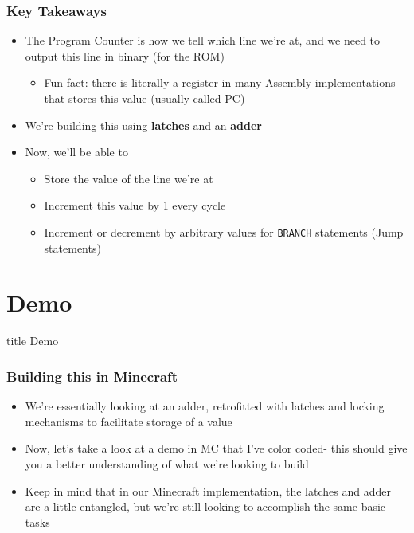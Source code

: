 \documentclass{beamer}
\begin{document}
             
        \begin{frame}
        	\frametitle{Key Takeaways}
        	\begin{itemize}
        		\item The Program Counter is how we tell which line we're at, and we need to output this line in binary (for the ROM)
        		\begin{itemize}
        			\item Fun fact: there is literally a register in many Assembly implementations that stores this value (usually called PC)
        		\end{itemize}
        		\item We're building this using \textbf{latches} and an \textbf{adder}
        		\item Now, we'll be able to
        		\begin{itemize}
        			\item Store the value of the line we're at
        			\item Increment this value by 1 every cycle
        			\item Increment or decrement by arbitrary values for \texttt{BRANCH} statements (Jump statements)
        		\end{itemize}
        	\end{itemize}
        \end{frame}
		
	
	\section{Demo}
	
	
		\begin{frame}
                \vfill
                \centering
                \begin{beamercolorbox}[sep=8pt,center,shadow=true,rounded=true]{title}
                    Demo\par%
                \end{beamercolorbox}
                \vfill
             \end{frame}
             
             
         \begin{frame}
         	\frametitle{Building this in Minecraft}
         	\begin{itemize}
         		\item We're essentially looking at an adder, retrofitted with latches and locking mechanisms to facilitate storage of a value
         		\item Now, let's take a look at a demo in MC that I've color coded- this should give you a better understanding of what we're looking to build
         		\item Keep in mind that in our Minecraft implementation, the latches and adder are a little entangled, but we're still looking to accomplish the same basic tasks
         	\end{itemize}
         \end{frame}
		
            
        
   	
\end{document}
